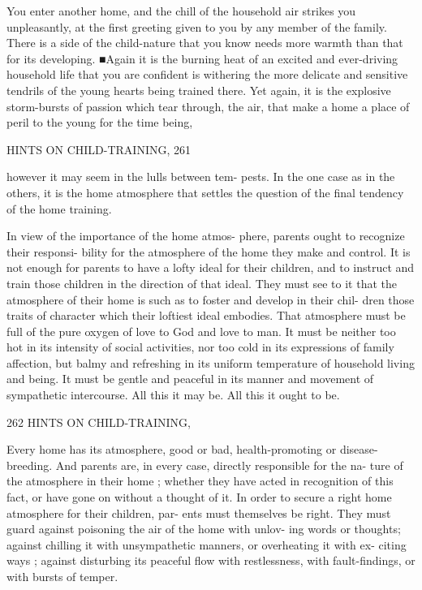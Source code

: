 \documentclass[
]{book}
\begin{document}
You enter another home, and the chill of the household air strikes you unpleasantly, at the first greeting given to you by any member of the family. There is a side of the child-nature that you know needs more warmth than that for its developing. ■Again it is the burning heat of an excited and ever-driving household life that you are confident is withering the more delicate and sensitive tendrils of the young hearts being trained there. Yet again, it is the explosive storm-bursts of passion which tear through, the air, that make a home a place of peril to the young for the time being,

HINTS ON CHILD-TRAINING, 261

however it may seem in the lulls between tem- pests. In the one case as in the others, it is the home atmosphere that settles the question of the final tendency of the home training.

In view of the importance of the home atmos- phere, parents ought to recognize their responsi- bility for the atmosphere of the home they make and control. It is not enough for parents to have a lofty ideal for their children, and to instruct and train those children in the direction of that ideal. They must see to it that the atmosphere of their home is such as to foster and develop in their chil- dren those traits of character which their loftiest ideal embodies. That atmosphere must be full of the pure oxygen of love to God and love to man. It must be neither too hot in its intensity of social activities, nor too cold in its expressions of family affection, but balmy and refreshing in its uniform temperature of household living and being. It must be gentle and peaceful in its manner and movement of sympathetic intercourse. All this it may be. All this it ought to be.

262 HINTS ON CHILD-TRAINING,

Every home has its atmosphere, good or bad, health-promoting or disease-breeding. And parents are, in every case, directly responsible for the na- ture of the atmosphere in their home ; whether they have acted in recognition of this fact, or have gone on without a thought of it. In order to secure a right home atmosphere for their children, par- ents must themselves be right. They must guard against poisoning the air of the home with unlov- ing words or thoughts; against chilling it with unsympathetic manners, or overheating it with ex- citing ways ; against disturbing its peaceful flow with restlessness, with fault-findings, or with bursts of temper.
\end{document}

